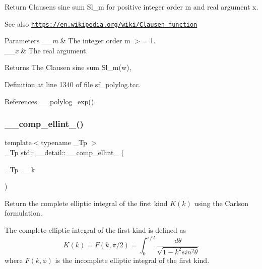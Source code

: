 Return Clausen\textquotesingle{}s sine sum Sl\+\_\+m for positive integer order m and real argument x. \begin{DoxySeeAlso}{See also}
\href{https://en.wikipedia.org/wiki/Clausen_function}{\tt https\+://en.\+wikipedia.\+org/wiki/\+Clausen\+\_\+function}
\end{DoxySeeAlso}

\begin{DoxyParams}{Parameters}
{\em \+\_\+\+\_\+m} & The integer order m $>$= 1. \\
\hline
{\em \+\_\+\+\_\+x} & The real argument. \\
\hline
\end{DoxyParams}
\begin{DoxyReturn}{Returns}
The Clausen sine sum Sl\+\_\+m(w), 
\end{DoxyReturn}


Definition at line 1340 of file sf\+\_\+polylog.\+tcc.



References \+\_\+\+\_\+polylog\+\_\+exp().

\mbox{\label{namespacestd_1_1____detail_a7b23bcf7e9f20b1e353a047126e13af1}} 
\subsubsection{\texorpdfstring{\+\_\+\+\_\+comp\+\_\+ellint\+\_()}{\_\_comp\_ellint\_1()}}
{\footnotesize\ttfamily template$<$typename \+\_\+\+Tp $>$ \\
\+\_\+\+Tp std\+::\+\_\+\+\_\+detail\+::\+\_\+\+\_\+comp\+\_\+ellint\+\_ (\begin{DoxyParamCaption}\item[{\+\_\+\+Tp}]{\+\_\+\+\_\+k }\end{DoxyParamCaption})}



Return the complete elliptic integral of the first kind $ K(k) $ using the Carlson formulation. 

The complete elliptic integral of the first kind is defined as \[ K(k) = F(k,\pi/2) = \int_0^{\pi/2}\frac{d\theta} {\sqrt{1 - k^2 sin^2\theta}} \] where $ F(k,\phi) $ is the incomplete elliptic integral of the first kind.



